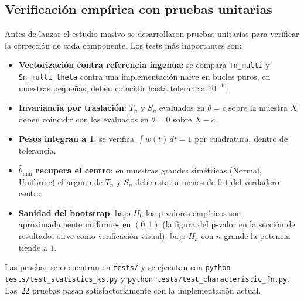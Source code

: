 \subsection{Verificación empírica con pruebas unitarias}

Antes de lanzar el estudio masivo se desarrollaron pruebas unitarias para verificar la corrección de cada componente. Los tests más importantes son:
\begin{itemize}
  \item \textbf{Vectorización contra referencia ingenua}: se compara \texttt{Tn\_multi} y \texttt{Sn\_multi\_theta} contra una implementación naive en bucles puros, en muestras pequeñas; deben coincidir hasta tolerancia $10^{-10}$.
  \item \textbf{Invariancia por traslación}: $T_n$ y $S_n$ evaluados en $\theta=c$ sobre la muestra $X$ deben coincidir con los evaluados en $\theta=0$ sobre $X-c$.
  \item \textbf{Pesos integran a 1}: se verifica $\int w(t)\,dt = 1$ por cuadratura, dentro de tolerancia.
  \item \textbf{$\hat\theta_{\min}$ recupera el centro}: en muestras grandes simétricas (Normal, Uniforme) el argmin de $T_n$ y $S_n$ debe estar a menos de $0.1$ del verdadero centro.
  \item \textbf{Sanidad del bootstrap}: bajo $H_0$ los p-valores empíricos son aproximadamente uniformes en $(0,1)$ (la figura del p-valor en la sección de resultados sirve como verificación visual); bajo $H_a$ con $n$ grande la potencia tiende a $1$.
\end{itemize}
Las pruebas se encuentran en \texttt{tests/} y se ejecutan con \texttt{python tests/test\_statistics\_ks.py} y \texttt{python tests/test\_characteristic\_fn.py}. Las~$22$ pruebas pasan satisfactoriamente con la implementación actual.
